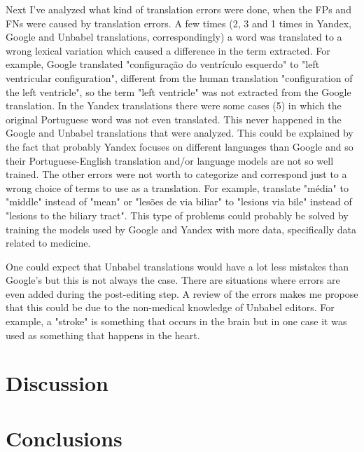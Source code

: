 Next I've analyzed what kind of translation errors were done, when the FPs and FNs were caused by translation errors. A few times (2, 3 and 1 times in Yandex, Google and Unbabel translations, correspondingly) a word was translated to a wrong lexical variation which caused a difference in the term extracted. For example, Google translated "configuração do ventrículo esquerdo" to "left ventricular configuration", different from the human translation "configuration of the left ventricle", so the term "left ventricle" was not extracted from the Google translation. In the Yandex translations there were some cases (5) in which the original Portuguese word was not even translated. This never happened in the Google and Unbabel translations that were analyzed. This could be explained by the fact that probably Yandex focuses on different languages than Google and so their Portuguese-English translation and/or language models are not so well trained. The other errors were not worth to categorize and correspond just to a wrong  choice of terms to use as a translation. For example, translate "média" to "middle" instead of "mean" or "lesões de via biliar" to "lesions via bile" instead of "lesions to the biliary tract". This type of problems could probably be solved by training the models used by Google and Yandex with more data, specifically data related to medicine.

One could expect that Unbabel translations would have a lot less mistakes than Google's but this is not always the case. There are situations where errors are even added during the post-editing step. A review of the errors makes me propose that this could be due to the non-medical knowledge of Unbabel editors. For example, a "stroke" is something that occurs in the brain but in one case it was used as something that happens in the heart.


\section{Discussion}





\section{Conclusions}




  

